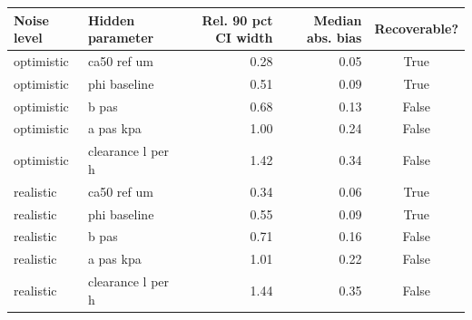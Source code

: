 \begin{tabular}{llrrc}
\toprule
Noise level & Hidden parameter & Rel. 90 pct CI width & Median abs. bias & Recoverable? \\
\midrule
optimistic & ca50 ref um & 0.28 & 0.05 & True \\
optimistic & phi baseline & 0.51 & 0.09 & True \\
optimistic & b pas & 0.68 & 0.13 & False \\
optimistic & a pas kpa & 1.00 & 0.24 & False \\
optimistic & clearance l per h & 1.42 & 0.34 & False \\
realistic & ca50 ref um & 0.34 & 0.06 & True \\
realistic & phi baseline & 0.55 & 0.09 & True \\
realistic & b pas & 0.71 & 0.16 & False \\
realistic & a pas kpa & 1.01 & 0.22 & False \\
realistic & clearance l per h & 1.44 & 0.35 & False \\
\bottomrule
\end{tabular}
